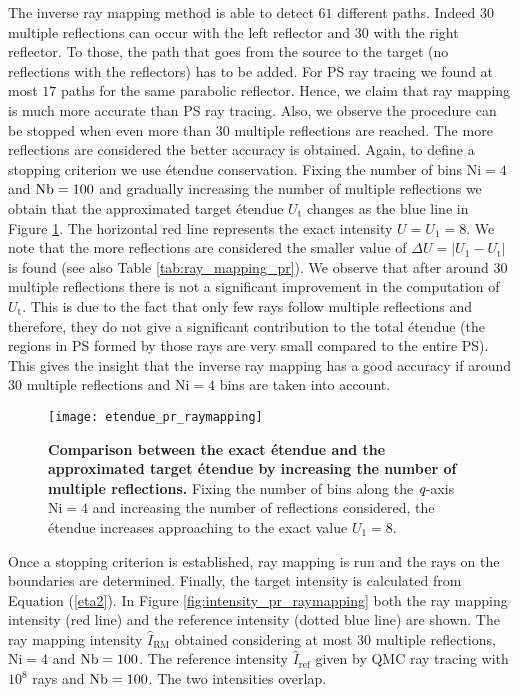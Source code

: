 The inverse ray mapping method is able to detect $61$ different paths. Indeed $30$ multiple reflections can occur with the left reflector and $30$ with the right reflector. To those, the path that goes from the source to the target (no reflections with the reflectors) has to be added. For PS ray tracing we found at most $17$ paths for the same parabolic reflector. Hence, we claim that ray mapping is much more accurate than PS ray tracing. Also, we observe the procedure can be stopped when even more than $30$ multiple reflections are reached. The more reflections are considered the better accuracy is obtained. Again, to define a stopping criterion we use \'{e}tendue conservation. Fixing the number of bins $\textrm{Ni}=4$ and $\textrm{Nb}=100$ and gradually increasing the number of multiple reflections we obtain that the approximated target \'{e}tendue $U_{\textrm{t}}$ changes as the blue line in Figure \ref{fig:etendue_pr_raymapping}. The horizontal red line represents the exact intensity $U = U_{1} = 8$. We note that the more reflections are considered the smaller value of $\Delta U = |U_1-U_{\textrm{t}}|$ is found (see also Table \ref{tab:ray_mapping_pr}). We observe that after around $30$ multiple reflections there is not a significant improvement in the computation of $U_{\textrm{t}}$. This is due to the fact that only few rays follow multiple reflections and therefore, they do not give a significant contribution to the total \'{e}tendue (the regions in PS formed by those rays are very small compared to the entire PS). This gives the insight that the inverse ray mapping has a good accuracy if around $30$ multiple reflections and $\textrm{Ni}=4$ bins are taken into account.
\begin{figure}[t]
  \begin{center}
  \texttt{[image: etendue\_pr\_raymapping]}
  \end{center}
  \caption{\textbf{Comparison between the exact \'{e}tendue and the approximated target \'{e}tendue by increasing the number of multiple reflections.}
Fixing the number of bins along the $\textit{q}$-axis $\textrm{Ni}=4$ and increasing the number of reflections considered, the \'{e}tendue increases approaching to the exact value $U_1=8$.}
\label{fig:etendue_pr_raymapping}
 \end{figure}
Once a stopping criterion is established, ray mapping is run and the rays on the boundaries are determined. Finally, the target intensity is calculated from Equation (\ref{eta2}). 
In Figure \ref{fig:intensity_pr_raymapping} both the ray mapping intensity (red line) and the reference intensity (dotted blue line) are shown. The ray mapping intensity $\hat{I}_{\textrm{RM}}$ obtained considering at most $30$ multiple reflections, $\textrm{Ni}=4$ and $\textrm{Nb} = 100$. The reference intensity $\hat{I}_{\textrm{ref}}$ given by QMC ray tracing with $10^8$ rays and $\textrm{Nb} = 100$. The two intensities overlap.

